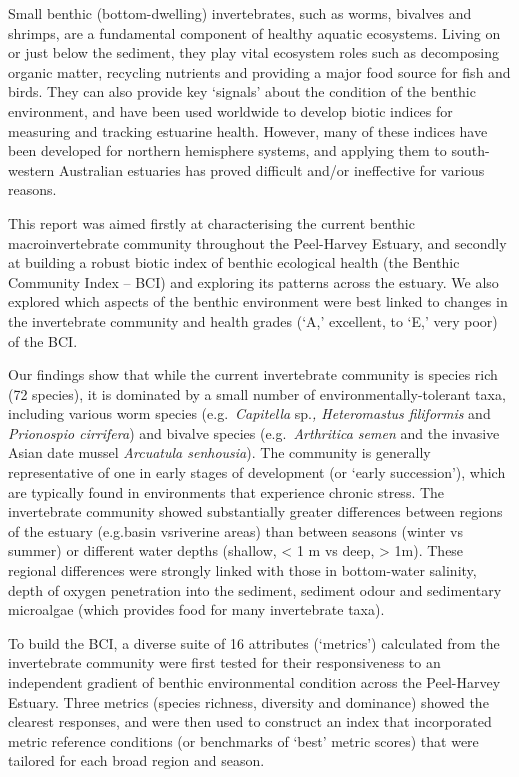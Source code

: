 \documentclass[
]{book}
\begin{document}
Small benthic (bottom-dwelling) invertebrates, such as worms, bivalves and shrimps, are a fundamental component of healthy aquatic ecosystems. Living on or just below the sediment, they play vital ecosystem roles such as decomposing organic matter, recycling nutrients and providing a major food source for fish and birds. They can also provide key `signals' about the condition of the benthic environment, and have been used worldwide to develop biotic indices for measuring and tracking estuarine health. However, many of these indices have been developed for northern hemisphere systems, and applying them to south-western Australian estuaries has proved difficult and/or ineffective for various reasons.

This report was aimed firstly at characterising the current benthic macroinvertebrate community throughout the Peel-Harvey Estuary, and secondly at building a robust biotic index of benthic ecological health (the Benthic Community Index -- BCI) and exploring its patterns across the estuary. We also explored which aspects of the benthic environment were best linked to changes in the invertebrate community and health grades (`A,' excellent, to `E,' very poor) of the BCI.

Our findings show that while the current invertebrate community is species rich (72 species), it is dominated by a small number of environmentally-tolerant taxa, including various worm species (e.g.~\emph{Capitella} sp.\emph{, Heteromastus filiformis} and \emph{Prionospio cirrifera}) and bivalve species (e.g.~\emph{Arthritica semen} and the invasive Asian date mussel \emph{Arcuatula senhousia}). The community is generally representative of one in early stages of development (or `early succession'), which are typically found in environments that experience chronic stress. The invertebrate community showed substantially greater differences between regions of the estuary (e.g.basin vsriverine areas) than between seasons (winter vs summer) or different water depths (shallow, \textless{} 1 m vs deep, \textgreater{} 1m). These regional differences were strongly linked with those in bottom-water salinity, depth of oxygen penetration into the sediment, sediment odour and sedimentary microalgae (which provides food for many invertebrate taxa).~

To build the BCI, a diverse suite of 16 attributes (`metrics') calculated from the invertebrate community were first tested for their responsiveness to an independent gradient of benthic environmental condition across the Peel-Harvey Estuary. Three metrics (species richness, diversity and dominance) showed the clearest responses, and were then used to construct an index that incorporated metric reference conditions (or benchmarks of `best' metric scores) that were tailored for each broad region and season.
\end{document}
